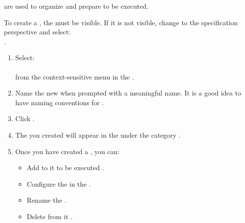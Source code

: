 \gdsuites{} are used to organize and prepare \gdcases{} to be executed. 

To create a \gdsuite{}, the \gdtestsuitebrowser{} must be visible.
 If it is not visible, change to the specification perspective and select:\\
.

\begin{enumerate}
\item Select:\\
\\
from the context-sensitive menu in the \gdtestsuitebrowser{}. 

 \item Name  the new \gdsuite{} when prompted with a meaningful name. It is a good idea to have naming conventions  for \gdsuites{}. 
\item Click . 
\item The \gdsuite{} you created will appear in the \gdtestsuitebrowser{} under the category \bxname{\gdsuites{}}. 
\item Once you have created a \gdsuite{}, you can:
\begin{itemize}
\item Add \gdcases{} to it to be executed .
\item Configure the \gdsuite{} in the \gdpropview{} .
\item Rename the \gdsuite{} .
\item Delete \gdcases{} from it .
\end{itemize}
\end{enumerate}




